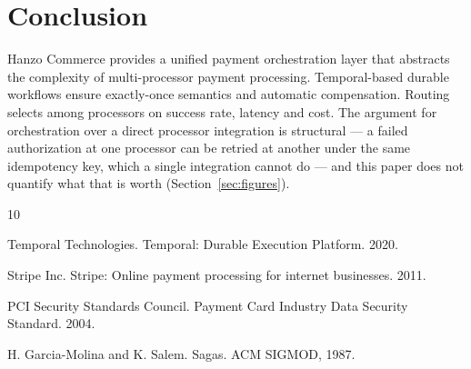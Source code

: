 \documentclass[11pt,twocolumn]{article}
\begin{document}
\section{Conclusion}

Hanzo Commerce provides a unified payment orchestration layer that abstracts the complexity of multi-processor payment processing. Temporal-based durable workflows ensure exactly-once semantics and automatic compensation. Routing selects among processors on success rate, latency and cost. The argument for orchestration over a direct processor integration is structural --- a failed authorization at one processor can be retried at another under the same idempotency key, which a single integration cannot do --- and this paper does not quantify what that is worth (Section~\ref{sec:figures}).


\begin{thebibliography}{10}

Temporal Technologies. Temporal: Durable Execution Platform. 2020.

Stripe Inc. Stripe: Online payment processing for internet businesses. 2011.

PCI Security Standards Council. Payment Card Industry Data Security Standard. 2004.

H. Garcia-Molina and K. Salem. Sagas. ACM SIGMOD, 1987.

\end{thebibliography}
\end{document}
